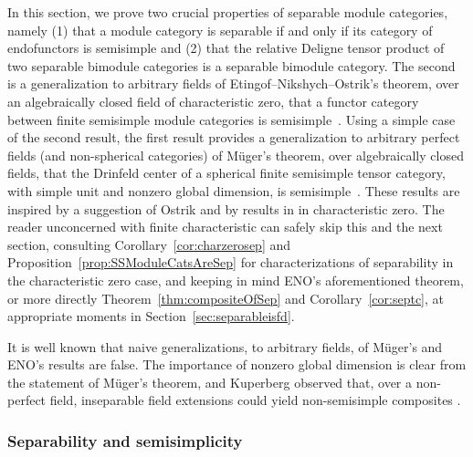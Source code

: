 \documentclass{amsart}
\begin{document}
In this section, we prove two crucial properties of separable module categories, namely (1) that a module category is separable if and only if its category of endofunctors is semisimple and (2) that the relative Deligne tensor product of two separable bimodule categories is a separable bimodule category.  The second is a generalization to arbitrary fields of Etingof--Nikshych--Ostrik's theorem, over an algebraically closed field of characteristic zero, that a functor category between finite semisimple module categories is semisimple~\cite[Theorem 2.16]{MR2183279}.  Using a simple case of the second result, the first result provides a generalization to arbitrary perfect fields (and non-spherical categories) of M\"uger's theorem, over algebraically closed fields, that the Drinfeld center of a spherical finite semisimple tensor category, with simple unit and nonzero global dimension, is semisimple~\cite[Theorem 3.16]{MR1966525}.    These results are inspired by a suggestion of Ostrik and by results in \cite[\S 2.4]{MR3039775} in characteristic zero.  The reader unconcerned with finite characteristic can safely skip this and the next section, consulting Corollary~\ref{cor:charzerosep} and Proposition~\ref{prop:SSModuleCatsAreSep} for characterizations of separability in the characteristic zero case, and keeping in mind ENO's aforementioned theorem, or more directly Theorem~\ref{thm:compositeOfSep} and Corollary~\ref{cor:septc}, at appropriate moments in Section~\ref{sec:separableisfd}.  

\begin{remark}
It is well known that naive generalizations, to arbitrary fields, of M\"uger's and ENO's results are false.  The importance of nonzero global dimension is clear from the statement of M\"uger's theorem, and Kuperberg observed that, over a non-perfect field, inseparable field extensions could yield non-semisimple composites \cite[Section 5]{MR1995781}.
\end{remark} 


\subsubsection{Separability and semisimplicity} \label{sec:sepandsemi}
\end{document}
